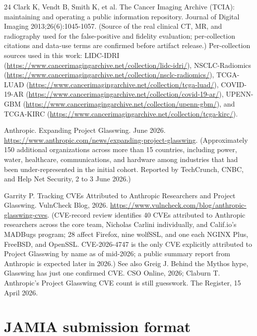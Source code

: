 \documentclass[11pt]{article}
\begin{document}
\begin{thebibliography}{24}
 Clark K, Vendt B, Smith K, et al. The Cancer Imaging Archive (TCIA): maintaining and operating a public information repository. Journal of Digital Imaging 2013;26(6):1045-1057. (Source of the real clinical CT, MR, and radiography used for the false-positive and fidelity evaluation; per-collection citations and data-use terms are confirmed before artifact release.) Per-collection sources used in this work: LIDC-IDRI (\url{https://www.cancerimagingarchive.net/collection/lidc-idri/}), NSCLC-Radiomics (\url{https://www.cancerimagingarchive.net/collection/nsclc-radiomics/}), TCGA-LUAD (\url{https://www.cancerimagingarchive.net/collection/tcga-luad/}), COVID-19-AR (\url{https://www.cancerimagingarchive.net/collection/covid-19-ar/}), UPENN-GBM (\url{https://www.cancerimagingarchive.net/collection/upenn-gbm/}), and TCGA-KIRC (\url{https://www.cancerimagingarchive.net/collection/tcga-kirc/}).

 Anthropic. Expanding Project Glasswing. June 2026. \url{https://www.anthropic.com/news/expanding-project-glasswing}. (Approximately 150 additional organizations across more than 15 countries, including power, water, healthcare, communications, and hardware among industries that had been under-represented in the initial cohort. Reported by TechCrunch, CNBC, and Help Net Security, 2 to 3 June 2026.)

 Garrity P. Tracking CVEs Attributed to Anthropic Researchers and Project Glasswing. VulnCheck Blog, 2026. \url{https://www.vulncheck.com/blog/anthropic-glasswing-cves}. (CVE-record review identifies 40 CVEs attributed to Anthropic researchers across the core team, Nicholas Carlini individually, and Calif.io's MADBugs program; 28 affect Firefox, nine wolfSSL, and one each NGINX Plus, FreeBSD, and OpenSSL. CVE-2026-4747 is the only CVE explicitly attributed to Project Glasswing by name as of mid-2026; a public summary report from Anthropic is expected later in 2026.) See also Greig J. Behind the Mythos hype, Glasswing has just one confirmed CVE. CSO Online, 2026; Claburn T. Anthropic's Project Glasswing CVE count is still guesswork. The Register, 15 April 2026.

\end{thebibliography}

\appendix

\section{JAMIA submission format}
\end{document}
